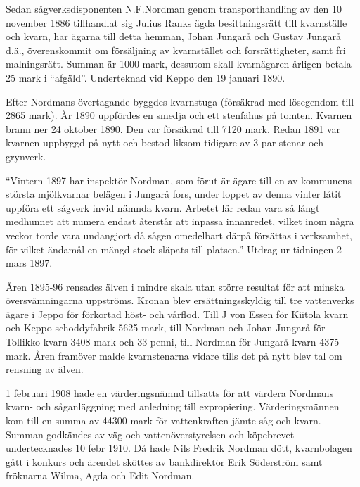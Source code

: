 Sedan sågverksdisponenten N.F.Nordman genom transporthandling av den 10 november 1886 tillhandlat sig Julius Ranks ägda besittningsrätt till kvarnställe och kvarn, har ägarna till detta hemman, Johan Jungarå och Gustav Jungarå d.ä., överenskommit om försäljning av kvarnstället och forsrättigheter, samt fri malningsrätt. Summan är 1000 mark, dessutom skall kvarnägaren årligen betala 25 mark i ``afgäld''. Underteknad vid Keppo den 19 januari 1890.

Efter Nordmans övertagande byggdes kvarnstuga (försäkrad med lösegendom till 2865 mark). År 1890 uppfördes en smedja och ett stenfähus på tomten. Kvarnen brann ner 24 oktober 1890. Den var försäkrad till 7120 mark. Redan 1891 var kvarnen uppbyggd på nytt och bestod liksom tidigare av 3 par stenar och grynverk.

``Vintern 1897 har inspektör Nordman, som förut är ägare till en av kommunens största mjölkvarnar belägen i Jungarå fors,  under loppet av denna vinter låtit uppföra ett sågverk invid nämnda kvarn. 	Arbetet lär redan vara så långt medhunnet att numera endast återstår att inpassa innanredet, vilket inom några veckor torde vara undangjort	då sågen omedelbart därpå försättas i verksamhet, för vilket ändamål en mängd stock släpats till platsen.'' Utdrag ur tidningen 2 mars 1897.

Åren 1895-96 rensades älven i mindre skala utan större resultat för att minska översvämningarna uppströms. Kronan blev ersättningsskyldig till tre vattenverks ägare i Jeppo för förkortad höst- och vårflod. Till J von Essen för Kiitola kvarn och Keppo schoddyfabrik 5625 mark, till Nordman och Johan Jungarå för Tollikko kvarn 3408 mark och 33 penni, till Nordman för Jungarå kvarn 4375 mark. Åren framöver malde kvarnstenarna vidare tills det på nytt blev tal om rensning av älven.

1 februari 1908 hade en värderingsnämnd tillsatts för att värdera Nordmans kvarn- och såganläggning med anledning till expropiering. Värderingsmännen kom till en summa av 44300 mark för vattenkraften jämte såg och kvarn. Summan godkändes av väg och vattenöverstyrelsen och köpebrevet undertecknades 10 febr 1910. Då hade Nils Fredrik Nordman dött, kvarnbolagen gått i konkurs och ärendet sköttes av bankdirektör Erik Söderström samt fröknarna Wilma, Agda och Edit Nordman.


